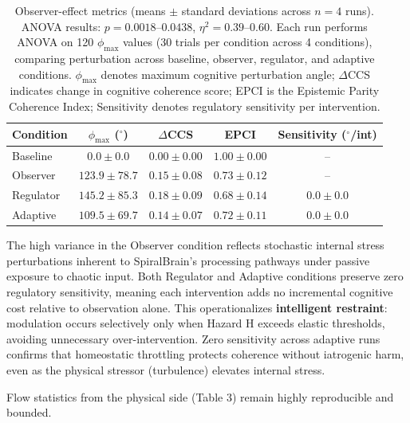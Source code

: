 \documentclass[12pt,a4paper]{article}
\begin{document}
\begin{table}[htbp!]
\centering

\begin{tabular}{@{}lcccc@{}}
\toprule
Condition & $\phi_{\max}$ ($^\circ$) & $\Delta$CCS & EPCI & Sensitivity ($^\circ$/int) \\
\midrule
Baseline  & $0.0 \pm 0.0$     & $0.00 \pm 0.00$ & $1.00 \pm 0.00$ & -- \\
Observer  & $123.9 \pm 78.7$  & $0.15 \pm 0.08$ & $0.73 \pm 0.12$ & -- \\
Regulator & $145.2 \pm 85.3$  & $0.18 \pm 0.09$ & $0.68 \pm 0.14$ & $0.0 \pm 0.0$ \\
Adaptive  & $109.5 \pm 69.7$  & $0.14 \pm 0.07$ & $0.72 \pm 0.11$ & $0.0 \pm 0.0$ \\
\bottomrule
\end{tabular}
\captionsetup{justification=raggedright, singlelinecheck=false}
\caption{\small Observer-effect metrics (means $\pm$ standard deviations across $n=4$ runs). 
ANOVA results: $p = 0.0018$--$0.0438$, $\eta^2 = 0.39$--$0.60$. 
Each run performs ANOVA on 120 $\phi_{\max}$ values (30 trials per condition across 4 conditions), comparing perturbation across baseline, observer, regulator, and adaptive conditions.
$\phi_{\max}$ denotes maximum cognitive perturbation angle; $\Delta$CCS indicates change in cognitive coherence score; 
EPCI is the Epistemic Parity Coherence Index; Sensitivity denotes regulatory sensitivity per intervention.}
\label{tab:metrics}
\end{table}

The high variance in the Observer condition reflects stochastic internal stress perturbations inherent to SpiralBrain's processing pathways under passive exposure to chaotic input. Both Regulator and Adaptive conditions preserve zero regulatory sensitivity, meaning each intervention adds no incremental cognitive cost relative to observation alone. This operationalizes \textbf{intelligent restraint}: modulation occurs selectively only when Hazard H exceeds elastic thresholds, avoiding unnecessary over-intervention. Zero sensitivity across adaptive runs confirms that homeostatic throttling protects coherence without iatrogenic harm, even as the physical stressor (turbulence) elevates internal stress.

\pagebreak

Flow statistics from the physical side (Table 3) remain highly reproducible and bounded.
\end{document}
